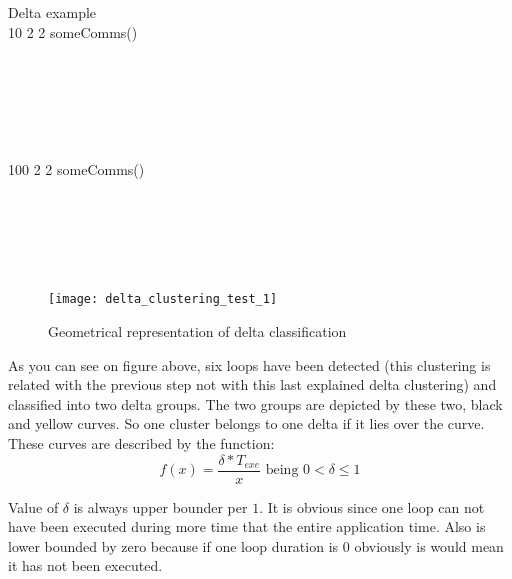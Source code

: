 \begin{multicols}{2}
  \begin{pseudocode}{Delta example}{ }
  \label{pc:delta_classification_example}
      \\
        10 \DO 
      \BEGIN 
          2 \DO
        \BEGIN 
            2 \DO
          \BEGIN 
              someComms() \\
          \END \\
           \\
        \END \\
         \\
      \END \\
      
      \\
        100 \DO
      \BEGIN 
          2 \DO
        \BEGIN 
            2 \DO
          \BEGIN 
              someComms()\\
          \END \\
           \\
        \END \\
         \\
      \END \\
  \end{pseudocode}
  \columnbreak
  \vfill \null
  \begin{figure}[H]
    \centering
    \texttt{[image: delta\_clustering\_test\_1]}
    \caption{Geometrical representation of delta classification}
    \label{fig:delta_classification_1}
  \end{figure}
  \vfill \null
\end{multicols}

As you can see on figure above, six loops have been detected (this clustering is
related with the previous step not with this last explained delta clustering) 
and classified into two delta groups. The two groups are depicted by these two,
black and yellow curves. So one cluster belongs to one delta if it lies over 
the curve. These curves are described by the function:
$$
f(x)=\frac{\delta*T_{exe}}{x} \text{ being }  0 < \delta \leq 1
$$

Value of $\delta$ is always upper bounder per $1$. It is obvious since one loop
can not have been executed during more time that the entire application time.
Also is lower bounded by zero because if one loop duration is 0 obviously is
would mean it has not been executed. 

